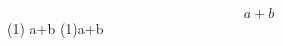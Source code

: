\documentclass{IEEEtran}
\begin{document}
\begin{equation}\label{a+b}
	  a+b
\end{equation}
(1) a+b \hfill (1)\linebreak a+b
\end{document}
